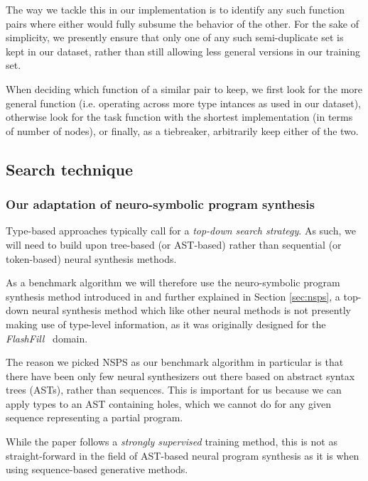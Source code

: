 \documentclass{article}
\begin{document}
The way we tackle this in our implementation is to identify any such function pairs where either would fully subsume the behavior of the other.
For the sake of simplicity, we presently ensure that only one of any such semi-duplicate set is kept in our dataset,
rather than still allowing less general versions in our training set.

When deciding which function of a similar pair to keep,
we first look for the more general function (i.e. operating across more type intances as used in our dataset),
otherwise look for the task function with the shortest implementation (in terms of number of nodes),
or finally, as a tiebreaker, arbitrarily keep either of the two.

\subsection{Search technique}

\subsubsection{Our adaptation of neuro-symbolic program synthesis} \label{sec:ournsps}

Type-based approaches typically call for a \emph{top-down search strategy}.
As such, we will need to build upon tree-based (or AST-based) rather than sequential (or token-based) neural synthesis methods.

As a benchmark algorithm we will therefore use the neuro-symbolic program synthesis method introduced in \citet{nsps} and further explained in Section \ref{sec:nsps},
a top-down neural synthesis method which like other neural methods is not presently making use of type-level information,
as it was originally designed for the \emph{FlashFill}~\citep{prose} domain.

The reason we picked NSPS as our benchmark algorithm in particular is that there have been only few neural synthesizers out there based on abstract syntax trees (ASTs), rather than sequences.
This is important for us because we can apply types to an AST containing holes,
which we cannot do for any given sequence representing a partial program.


While the paper follows a \emph{strongly supervised} training method,
this is not as straight-forward in the field of AST-based neural program synthesis as it is when using sequence-based generative methods.
\end{document}
